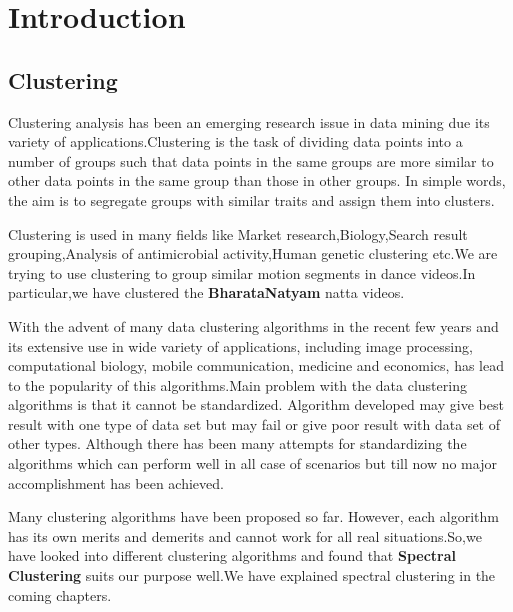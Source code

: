 
\chapter{Introduction} %

\label{Chapter 1} %


\section{Clustering}
Clustering analysis  has been an  emerging  research  issue in data mining due its variety of  applications.Clustering is the task of dividing data points into a number of groups such that data points in the same groups are more similar to other data points in the same group than those in other groups. In simple words, the aim is to segregate groups with similar traits and assign them into clusters. 

Clustering is  used in many fields like Market research,Biology,Search result grouping,Analysis of antimicrobial activity,Human genetic clustering etc.We are trying to use clustering to group similar motion segments in dance videos.In particular,we have clustered the \textbf{BharataNatyam} natta videos.


With the advent of many data clustering  algorithms  in  the  recent  few  years  and its extensive  use in  wide variety of applications,  including image processing, computational biology, mobile communication, medicine and economics,  has  lead  to  the  popularity of  this  algorithms.Main  problem with  the data clustering algorithms is   that it  cannot  be  standardized.   Algorithm developed may  give  best  result  with one type of data set  but  may  fail or  give  poor  result with  data set of other types.  Although  there  has  been  many  attempts   for  standardizing  the  algorithms  which can   perform   well   in  all  case  of scenarios but  till  now  no major accomplishment  has been achieved.

Many clustering algorithms  have  been  proposed so far. However, each  algorithm has its own  merits and demerits  and cannot  work  for  all  real  situations.So,we have looked into different clustering algorithms and found that \textbf{Spectral Clustering}  suits our purpose well.We have explained spectral clustering in the coming chapters.

